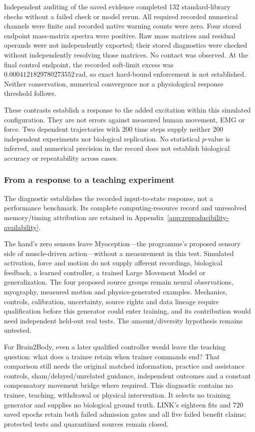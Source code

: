 

Independent auditing of the saved evidence completed 132 standard-library checks without a failed check or model rerun. All required recorded numerical channels were finite and recorded native warning counts were zero. Four stored endpoint mass-matrix spectra were positive. Raw mass matrices and residual operands were not independently exported; their stored diagnostics were checked without independently resolving those matrices. No contact was observed. At the final control endpoint, the recorded soft-limit excess was $0.0004121829780273552\,\mathrm{rad}$, so exact hard-bound enforcement is not established. Neither conservation, numerical convergence nor a physiological response threshold follows.

These contrasts establish a response to the added excitation within this simulated configuration. They are not errors against measured human movement, EMG or force. Two dependent trajectories with 200 time steps supply neither 200 independent experiments nor biological replication. No statistical $p$-value is inferred, and numerical precision in the record does not establish biological accuracy or repeatability across cases.

\subsubsection{From a response to a teaching experiment}

The diagnostic establishes the recorded input-to-state response, not a performance benchmark. Its complete computing-resource record and unresolved memory/timing attribution are retained in Appendix~\ref{app:reproducibility-availability}.

The hand's zero sensors leave Myoception---the programme's proposed sensory side of muscle-driven action---without a measurement in this test. Simulated activation, force and motion do not supply afferent recordings, biological feedback, a learned controller, a trained Large Movement Model or generalization. The four proposed source groups remain neural observations, myography, measured motion and physics-generated examples. Mechanics, controls, calibration, uncertainty, source rights and data lineage require qualification before this generator could enter training, and its contribution would need independent held-out real tests. The amount/diversity hypothesis remains untested.

For Brain2Body, even a later qualified controller would leave the teaching question: what does a trainee retain when trainer commands end? That comparison still needs the original matched information, practice and assistance controls, sham/delayed/unrelated guidance, independent outcomes and a constant compensatory movement bridge where required. This diagnostic contains no trainee, teaching, withdrawal or physical intervention. It selects no training generator and supplies no biological ground truth. LINK's eighteen fits and 720 saved epochs retain both failed admission gates and all five failed benefit claims; protected tests and quarantined sources remain closed.


